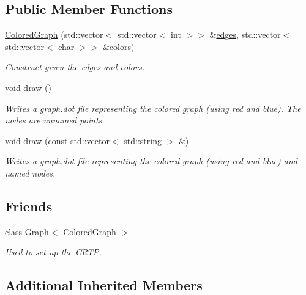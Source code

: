 \subsection*{Public Member Functions}
\begin{DoxyCompactItemize}
\item 
\hyperlink{classMackey_1_1ColoredGraph_adada856cdbfc508b2df15919f45a1808}{Colored\+Graph} (std\+::vector$<$ std\+::vector$<$ int $>$$>$ \&\hyperlink{classMackey_1_1Graph_a729ec24b9f9e504f4c4e2d3f6e2cab83}{edges}, std\+::vector$<$ std\+::vector$<$ char $>$$>$ \&colors)
\begin{DoxyCompactList}\small\item\em Construct given the edges and colors. \end{DoxyCompactList}\item 
void \hyperlink{classMackey_1_1ColoredGraph_a8ed05073805b34a0087a7ed94e889694}{draw} ()
\begin{DoxyCompactList}\small\item\em Writes a graph.\+dot file representing the colored graph (using red and blue). The nodes are unnamed points. \end{DoxyCompactList}\item 
void \hyperlink{classMackey_1_1ColoredGraph_a912a6e5cb94386d9ff6510e968b41e7d}{draw} (const std\+::vector$<$ std\+::string $>$ \&)
\begin{DoxyCompactList}\small\item\em Writes a graph.\+dot file representing the colored graph (using red and blue) and named nodes. \end{DoxyCompactList}\end{DoxyCompactItemize}
\subsection*{Friends}
\begin{DoxyCompactItemize}
\item 
class \hyperlink{classMackey_1_1ColoredGraph_a2debfc8158c19d7b93550156a3e2676a}{Graph$<$ Colored\+Graph $>$}
\begin{DoxyCompactList}\small\item\em Used to set up the C\+R\+TP. \end{DoxyCompactList}\end{DoxyCompactItemize}
\subsection*{Additional Inherited Members}


